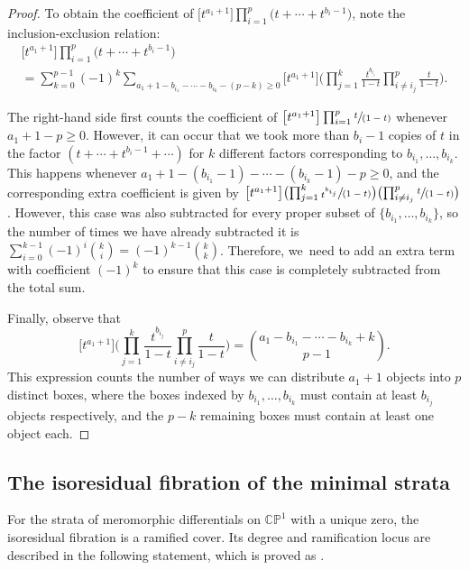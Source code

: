 \documentclass[11pt]{article}
\newcommand{\spfrac}[2]{\sfrac{#1}{(#2)}}
\theoremstyle{definition}
\begin{document}
\begin{proof}
To obtain the coefficient of $\big[t^{a_1+1}\big]\prod_{i=1}^p \big(t + \cdots + t^{b_i-1}\big)$, note the inclusion-exclusion relation:
\begin{multline*}
\big[t^{a_1+1}\big]\prod_{i=1}^p \big(t + \cdots + t^{b_i-1}\big)\\[-10pt]
= \sum_{k=0}^{p-1} (-1)^k \sum_{a_{1}+1-b_{i_1}-\cdots-b_{i_k}-(p-k)\geq 0} \big[t^{a_1+1}\big]\biggl(\prod_{j=1}^k \frac{t^{b_{i_j}}}{1-t}\prod_{i\not= i_j}^p\frac{t}{1-t}\biggr).
\end{multline*}

The right-hand side first counts the coefficient of $\big[t^{a_1+1}\big]\prod_{i=1}^p \spfrac{t}{1-t}$ whenever $a_1+1-p\geq 0$. However, it can occur that we took more than $b_i-1$ copies of $t$ in the factor $(t+\cdots+t^{b_{i}-1}+\cdots)$ for $k$ different factors corresponding to $b_{i_1},\ldots, b_{i_k}$. This happens whenever $a_1+1-(b_{i_1}-1)-\cdots-(b_{i_k}-1)-p\geq 0$, and the corresponding extra coefficient is given by $\big[t^{a_1+1}\big]\bigl(\prod_{j=1}^k \spfrac{t^{b_{i_j}}}{1-t}\bigr)\bigl(\prod_{i\not= i_j}^p\spfrac{t}{1-t}\bigr)$. However, this case was also subtracted for every proper subset of $\{b_{i_1},\ldots, b_{i_k}\}$, so the number of times we have already subtracted it is $\sum_{i=0}^{k-1}(-1)^i\binom{k}{i}=(-1)^{k-1}\binom{k}{k}$. Therefore, we~need to add an extra term with coefficient $(-1)^k$ to ensure that this case is completely subtracted from the total sum.

Finally, observe that
\begin{equation*}\label{eq:Counting}
\big[t^{a_1+1}\big]\biggl(\prod_{j=1}^k \frac{t^{b_{i_j}}}{1-t}\prod_{i\not=i_j}^p\frac{t}{1-t}\biggr) = \binom{a_1-b_{i_1}-\cdots - b_{i_k}+k}{p-1}.
\end{equation*}
This expression counts the number of ways we can distribute $a_1+1$ objects into $p$ distinct boxes, where the boxes indexed by $b_{i_1},\ldots, b_{i_{k}}$ must contain at least $b_{i_j}$ objects respectively, and the $p-k$ remaining boxes must contain at least one object each.
\end{proof}

\subsection{The isoresidual fibration of the minimal strata}\label{sub:Minimal}

For the strata of meromorphic differentials on $\mathbb{CP}^{1}$ with a unique zero, the isoresidual fibration is a ramified cover. Its degree and ramification locus are described in the following statement, which is proved as \cite[Th.\,1.2]{GeTaIso}.
\end{document}
